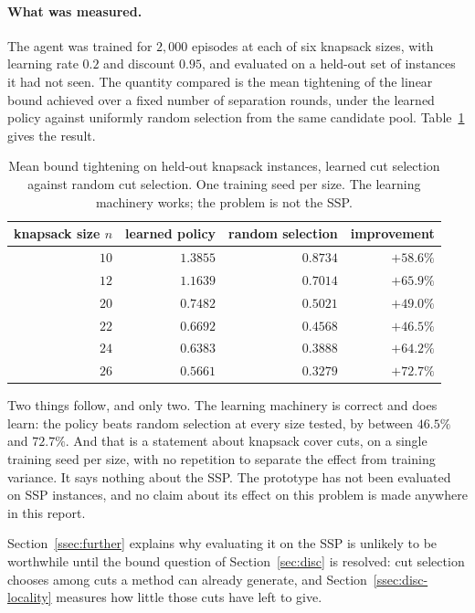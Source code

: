 \paragraph{What was measured.}
The agent was trained for $2{,}000$ episodes at each of six knapsack sizes, with
learning rate $0.2$ and discount $0.95$, and evaluated on a held-out set of instances
it had not seen. The quantity compared is the mean tightening of the linear bound
achieved over a fixed number of separation rounds, under the learned policy against
uniformly random selection from the same candidate pool. Table~\ref{tab:rl} gives the
result.

\begin{table}[h]\centering
\footnotesize
\begin{tabular}{@{}rrrr@{}}
\toprule
knapsack size $n$ & learned policy & random selection & improvement\\
\midrule
$10$ & $1.3855$ & $0.8734$ & $+58.6\%$\\
$12$ & $1.1639$ & $0.7014$ & $+65.9\%$\\
$20$ & $0.7482$ & $0.5021$ & $+49.0\%$\\
$22$ & $0.6692$ & $0.4568$ & $+46.5\%$\\
$24$ & $0.6383$ & $0.3888$ & $+64.2\%$\\
$26$ & $0.5661$ & $0.3279$ & $+72.7\%$\\
\bottomrule
\end{tabular}
\caption{Mean bound tightening on held-out knapsack instances, learned cut selection
against random cut selection. One training seed per size. The learning machinery works;
the problem is not the SSP.}
\label{tab:rl}
\end{table}

Two things follow, and only two. The learning machinery is correct and does learn: the
policy beats random selection at every size tested, by between $46.5\%$ and $72.7\%$. And
that is a statement about knapsack cover cuts, on a single training seed per size, with
no repetition to separate the effect from training variance. It says nothing about the
SSP. The prototype has not been evaluated on SSP instances, and no claim about its
effect on this problem is made anywhere in this report.

Section~\ref{ssec:further} explains why evaluating it on the SSP is unlikely to be
worthwhile until the bound question of Section~\ref{sec:disc} is resolved: cut
selection chooses among cuts a method can already generate, and
Section~\ref{ssec:disc-locality} measures how little those cuts have left to give.
